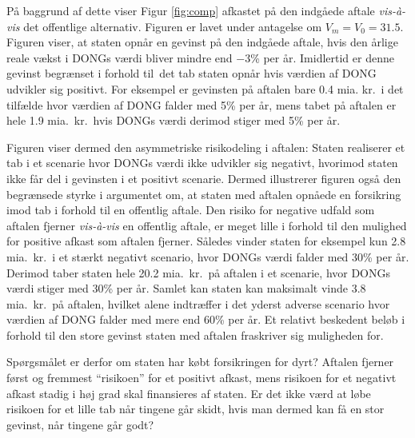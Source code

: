 \documentclass{article}
\begin{document}
På baggrund af dette viser Figur \ref{fig:comp} afkastet på den indgåede aftale \emph{vis-\`{a}-vis} det offentlige alternativ. Figuren er lavet under antagelse om  $V_m=V_0=31.5$. Figuren viser, at staten opnår en gevinst på den indgåede aftale, hvis den årlige reale vækst i DONGs værdi bliver mindre end $-3$\% per år. Imidlertid er denne gevinst begrænset i forhold til\ det tab staten opnår hvis værdien af DONG udvikler sig positivt. For eksempel er gevinsten på aftalen bare 0.4 mia. kr.\ i det tilfælde hvor værdien af DONG falder med 5\% per år, mens tabet på aftalen er hele 1.9 mia.\ kr.\ hvis DONGs værdi derimod stiger med 5\% per år.

Figuren viser dermed den asymmetriske risikodeling i aftalen: Staten realiserer et tab i et scenarie hvor DONGs værdi ikke udvikler sig negativt, hvorimod staten ikke får del i gevinsten i et positivt scenarie. Dermed illustrerer figuren også den begrænsede styrke i argumentet om, at staten med aftalen opnåede en forsikring imod tab i forhold til en offentlig aftale. Den risiko for negative udfald som aftalen fjerner \emph{vis-\`{a}-vis} en offentlig aftale, er meget lille i forhold til den mulighed for positive afkast som aftalen fjerner. Således vinder staten for eksempel kun 2.8 mia.\ kr.\ i et stærkt negativt scenario, hvor DONGs værdi falder med 30\% per år. Derimod taber staten hele 20.2 mia.\ kr.\ på aftalen i et scenarie, hvor DONGs værdi stiger med 30\% per år. Samlet kan staten kan maksimalt vinde 3.8 mia.\ kr.\ på aftalen, hvilket alene indtræffer i det yderst adverse scenario hvor værdien af DONG falder med mere end 60\% per år. Et relativt beskedent beløb i forhold til den store gevinst staten med aftalen fraskriver sig muligheden for.

Spørgsmålet er derfor om staten har købt forsikringen for dyrt? Aftalen fjerner først og fremmest \enquote{risikoen} for et positivt afkast, mens risikoen for et negativt afkast stadig i høj grad skal finansieres af staten. Er det ikke værd at løbe risikoen for et lille tab når tingene går skidt, hvis man dermed kan få en stor gevinst, når tingene går godt?
\end{document}
